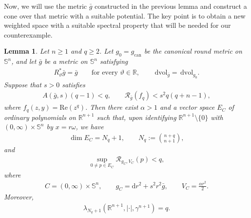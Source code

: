 \documentclass[11pt,reqno]{amsart}
\numberwithin{equation}{section}
\newtheorem{lem}[thm]{Lemma}
\theoremstyle{definition}
\theoremstyle{remark}
\def\cR {\mathcal{R}}
\newcommand{\lam}{\lambda}
\renewcommand\Re{\mathrm{Re}\,}
\renewcommand{\Re}{\mathrm{Re}}
\newcommand{\ud}{\mathrm{d}}
\newcommand{\0}{\emptyset}
\newcommand{\bbR}{\mathbb R}
\newcommand{\bbS}{\mathbb S}
\newcommand{\can}{\mathrm{can}}
\newcommand{\dvol}{\,\mathrm{dvol}}
\begin{document}
Now, we will use the metric $\bar{g}$ constructed in the previous lemma and construct a cone over that metric with a suitable potential. The key point is to obtain a new weighted space with a suitable spectral property that will be needed for our counterexample. 
\begin{lem}\label{lem:gaussian-split-polynomial-cone}
Let $n\geq1$ and $q\geq2$. Let $g_0=g_\can$ be the canonical round metric
on $\bbS^n$, and let $\bar g$ be a metric on $\bbS^n$ satisfying
\begin{align}
        R_\vartheta^*\bar g
        =
        \bar g
        \qquad
        \text{for every }\vartheta\in\bbR,
        \qquad
        \dvol_{\bar g}
        =
        \dvol_{g_0}.
\end{align} 
Suppose that $s>0$ satisfies
\begin{align}\label{eq:gaussian-split-polynomial-assumptions}
        A(\bar g,s)(q-1)<q,
        \qquad
        \cR_{\bar g}(f_q)<s^2q(q+n-1),
\end{align}
where $f_q(z,y)=\Re(z^q)$. Then there exist $\alpha>1$ and a vector space
$E_C$ of ordinary polynomials on $\bbR^{n+1}$ such that, upon identifying
$\bbR^{n+1}\setminus\{0\}$ with $(0,\infty)\times\bbS^n$ by $x=r\omega$, we
have
\begin{align}\label{eq:gaussian-split-polynomial-dimension}
        \dim E_C=N_q+1,
        \qquad
        N_q:=\binom{n+q}{n+1},
\end{align}
and
\begin{align}\label{eq:gaussian-split-polynomial-Rayleigh}
        \sup_{0\neq p\in E_C}
        \cR_{g_C,V_C}(p)<q,
\end{align}
where
\begin{align}\label{eq:gaussian-split-polynomial-cone}
        C=(0,\infty)\times\bbS^n,
        \qquad
        g_C=\ud r^2+s^2r^2\bar g,
        \qquad
        V_C=\frac{\alpha r^2}{2}.
\end{align}
Moreover,
\begin{align}\label{eq:gaussian-split-Gaussian-index}
        \lam_{N_q+1}
        (\bbR^{n+1},|\cdot|,\gamma^{n+1})=q.
\end{align}
\end{lem}
\end{document}
